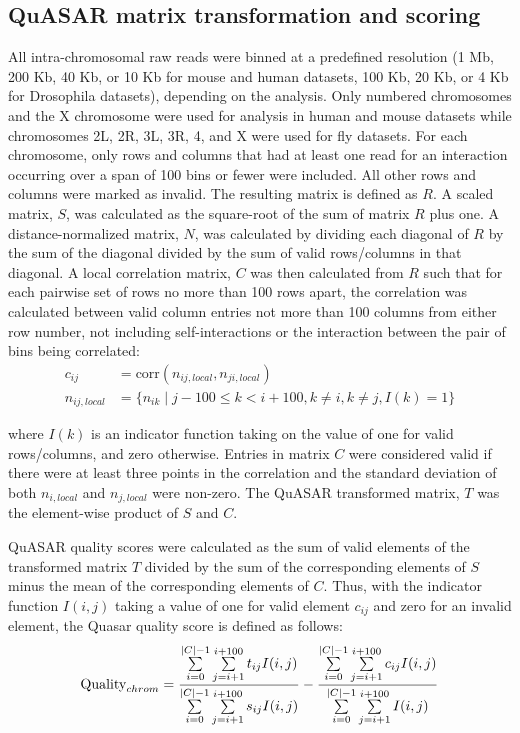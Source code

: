 \subsection{QuASAR matrix transformation and scoring}

All intra-chromosomal raw reads were binned at a predefined resolution (1 Mb, 200 Kb, 40 Kb, or 10 Kb for mouse and human datasets, 100 Kb, 20 Kb, or 4 Kb for Drosophila datasets), depending on the analysis. Only numbered chromosomes and the X chromosome were used for analysis in human and mouse datasets while chromosomes 2L, 2R, 3L, 3R, 4, and X were used for fly datasets. For each chromosome, only rows and columns that had at least one read for an interaction occurring over a span of 100 bins or fewer were included. All other rows and columns were marked as invalid. The resulting matrix is defined as $R$. A scaled matrix, $S$, was calculated as the square-root of the sum of matrix $R$ plus one. A distance-normalized matrix, $N$, was calculated by dividing each diagonal of $R$ by the sum of the diagonal divided by the sum of valid rows/columns in that diagonal. A local correlation matrix, $C$ was then calculated from $R$ such that for each pairwise set of rows no more than 100 rows apart, the correlation was calculated between valid column entries not more than 100 columns from either row number, not including self-interactions or the interaction between the pair of bins being correlated:
\begin{align*}
  c_{ij} &= \text{corr}(n_{ij,local},n_{ji,local}) \\
  n_{ij,local} &= \{ n_{ik} \mid j-100 \leq k < i+100, k \neq i, k \neq j, I(k) = 1 \}
\end{align*}

where $I(k)$ is an indicator function taking on the value of one for valid rows/columns, and zero otherwise. Entries in matrix $C$ were considered valid if there were at least three points in the correlation and the standard deviation of both $n_{i,local}$ and $n_{j,local}$ were non-zero. The QuASAR transformed matrix, $T$ was the element-wise product of $S$ and $C$.

QuASAR quality scores were calculated as the sum of valid elements of the transformed matrix $T$ divided by the sum of the corresponding elements of $S$ minus the mean of the corresponding elements of $C$. Thus, with the indicator function $I(i,j)$ taking a value of one for valid element $c_{ij}$ and zero for an invalid element, the Quasar quality score is defined as follows:
\[\textnormal{Quality}_{chrom}=\frac{\sum\limits_{i=0}^{|C|-1}\sum\limits_{j=i+1}^{i+100}t_{ij}I(i,j)}{\sum\limits_{i=0}^{|C|-1}\sum\limits_{j=i+1}^{i+100}s_{ij}I(i,j)}-\frac{\sum\limits_{i=0}^{|C|-1}\sum\limits_{j=i+1}^{i+100}c_{ij}I(i,j)}{\sum\limits_{i=0}^{|C|-1}\sum\limits_{j=i+1}^{i+100}I(i,j)}\]

